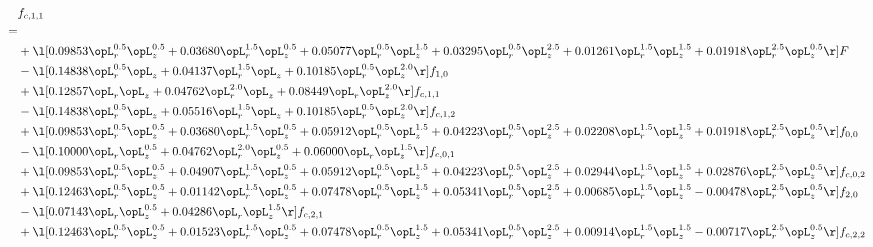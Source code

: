 \begin{alignat}{2} 
\label{eq:f_11_1} 
& f_{c,1,1} \nonumber \\ 
 = \\ 
& + \l[  0.09853 \opL_r^{0.5} \opL_z^{0.5} +  0.03680 \opL_r^{1.5} \opL_z^{0.5} +  0.05077 \opL_r^{0.5} \opL_z^{1.5} +  0.03295 \opL_r^{0.5} \opL_z^{2.5} +  0.01261 \opL_r^{1.5} \opL_z^{1.5} +  0.01918 \opL_r^{2.5} \opL_z^{0.5}  \r] F \nonumber \\ 
& - \l[  0.14838 \opL_r^{0.5} \opL_z +  0.04137 \opL_r^{1.5} \opL_z +  0.10185 \opL_r^{0.5} \opL_z^{2.0}  \r] f_{1,0} \nonumber \\ 
& + \l[  0.12857 \opL_r \opL_z +  0.04762 \opL_r^{2.0} \opL_z +  0.08449 \opL_r \opL_z^{2.0}  \r] f_{c,1,1} \nonumber \\ 
& - \l[  0.14838 \opL_r^{0.5} \opL_z +  0.05516 \opL_r^{1.5} \opL_z +  0.10185 \opL_r^{0.5} \opL_z^{2.0}  \r] f_{c,1,2} \nonumber \\ 
& + \l[  0.09853 \opL_r^{0.5} \opL_z^{0.5} +  0.03680 \opL_r^{1.5} \opL_z^{0.5} +  0.05912 \opL_r^{0.5} \opL_z^{1.5} +  0.04223 \opL_r^{0.5} \opL_z^{2.5} +  0.02208 \opL_r^{1.5} \opL_z^{1.5} +  0.01918 \opL_r^{2.5} \opL_z^{0.5}  \r] f_{0,0} \nonumber \\ 
& - \l[  0.10000 \opL_r \opL_z^{0.5} +  0.04762 \opL_r^{2.0} \opL_z^{0.5} +  0.06000 \opL_r \opL_z^{1.5}  \r] f_{c,0,1} \nonumber \\ 
& + \l[  0.09853 \opL_r^{0.5} \opL_z^{0.5} +  0.04907 \opL_r^{1.5} \opL_z^{0.5} +  0.05912 \opL_r^{0.5} \opL_z^{1.5} +  0.04223 \opL_r^{0.5} \opL_z^{2.5} +  0.02944 \opL_r^{1.5} \opL_z^{1.5} +  0.02876 \opL_r^{2.5} \opL_z^{0.5}  \r] f_{c,0,2} \nonumber \\ 
& + \l[  0.12463 \opL_r^{0.5} \opL_z^{0.5} +  0.01142 \opL_r^{1.5} \opL_z^{0.5} +  0.07478 \opL_r^{0.5} \opL_z^{1.5} +  0.05341 \opL_r^{0.5} \opL_z^{2.5} +  0.00685 \opL_r^{1.5} \opL_z^{1.5}   -0.00478 \opL_r^{2.5} \opL_z^{0.5}  \r] f_{2,0} \nonumber \\ 
& - \l[  0.07143 \opL_r \opL_z^{0.5} +  0.04286 \opL_r \opL_z^{1.5}  \r] f_{c,2,1} \nonumber \\ 
& + \l[  0.12463 \opL_r^{0.5} \opL_z^{0.5} +  0.01523 \opL_r^{1.5} \opL_z^{0.5} +  0.07478 \opL_r^{0.5} \opL_z^{1.5} +  0.05341 \opL_r^{0.5} \opL_z^{2.5} +  0.00914 \opL_r^{1.5} \opL_z^{1.5}   -0.00717 \opL_r^{2.5} \opL_z^{0.5}  \r] f_{c,2,2} \nonumber \\ 
\end{alignat} 


